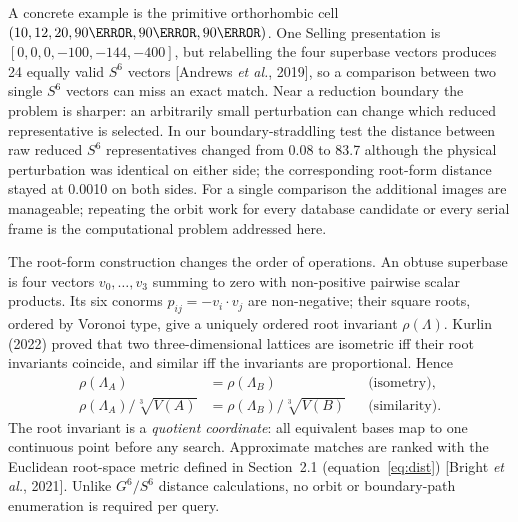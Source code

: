 \documentclass[11pt]{article}
\newcommand{\rootinv}{\rho}
\begin{document}
A concrete example is the primitive orthorhombic cell
$(10, 12, 20, 90\degree, 90\degree, 90\degree)$. One Selling presentation is
$[0, 0, 0, -100, -144, -400]$, but relabelling the four superbase vectors
produces 24 equally valid $S^6$ vectors [Andrews \textit{et al.}, 2019], so a
comparison between two single $S^6$ vectors can miss an exact match. Near a
reduction boundary the problem is sharper: an arbitrarily small perturbation can
change which reduced representative is selected. In our boundary-straddling test
the distance between raw reduced $S^6$ representatives changed from 0.08 to 83.7
although the physical perturbation was identical on either side; the
corresponding root-form distance stayed at 0.0010 on both sides. For a single
comparison the additional images are manageable; repeating the orbit work for
every database candidate or every serial frame is the computational problem
addressed here.

The root-form construction changes the order of operations. An obtuse superbase
is four vectors $v_0, \dots, v_3$ summing to zero with non-positive pairwise
scalar products. Its six conorms $p_{ij} = -v_i\!\cdot\!v_j$ are non-negative;
their square roots, ordered by Voronoi type, give a uniquely ordered root
invariant $\rootinv(\Lambda)$. Kurlin (2022) proved that two three-dimensional
lattices are isometric iff their root invariants coincide, and similar iff the
invariants are proportional. Hence
\begin{align}
\rootinv(\Lambda_A) &= \rootinv(\Lambda_B)
   && \text{(isometry)}, \\
\rootinv(\Lambda_A)/\sqrt[3]{V(A)} &= \rootinv(\Lambda_B)/\sqrt[3]{V(B)}
   && \text{(similarity)}.
\end{align}
The root invariant is a \emph{quotient coordinate}: all equivalent bases map to
one continuous point before any search. Approximate matches are ranked with the
Euclidean root-space metric defined in Section~2.1 (equation~\eqref{eq:dist})
[Bright \textit{et al.}, 2021]. Unlike $G^6/S^6$
distance calculations, no orbit or boundary-path enumeration is required per
query.
\end{document}
